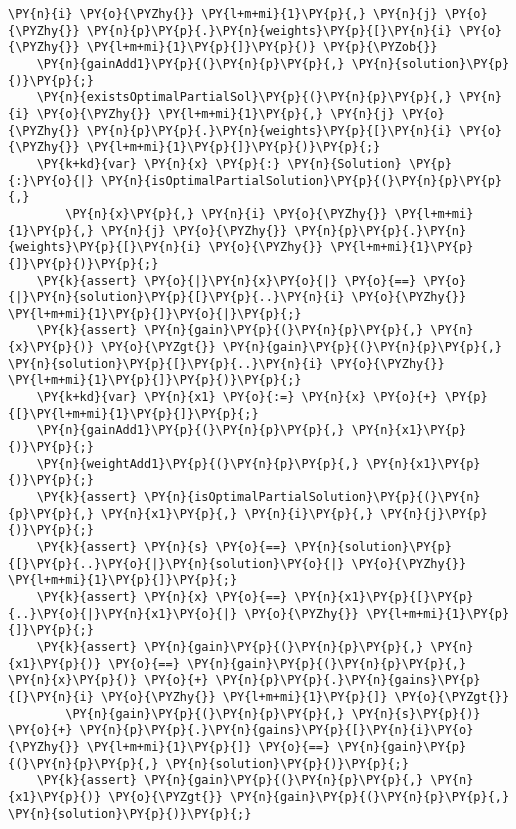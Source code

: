 \begin{sloppypar}
\begin{Verbatim}[commandchars=\\\{\}]
    \PY{n}{i} \PY{o}{\PYZhy{}} \PY{l+m+mi}{1}\PY{p}{,} \PY{n}{j} \PY{o}{\PYZhy{}} \PY{n}{p}\PY{p}{.}\PY{n}{weights}\PY{p}{[}\PY{n}{i} \PY{o}{\PYZhy{}} \PY{l+m+mi}{1}\PY{p}{]}\PY{p}{)} \PY{p}{\PYZob{}}
    \PY{n}{gainAdd1}\PY{p}{(}\PY{n}{p}\PY{p}{,} \PY{n}{solution}\PY{p}{)}\PY{p}{;}
    \PY{n}{existsOptimalPartialSol}\PY{p}{(}\PY{n}{p}\PY{p}{,} \PY{n}{i} \PY{o}{\PYZhy{}} \PY{l+m+mi}{1}\PY{p}{,} \PY{n}{j} \PY{o}{\PYZhy{}} \PY{n}{p}\PY{p}{.}\PY{n}{weights}\PY{p}{[}\PY{n}{i} \PY{o}{\PYZhy{}} \PY{l+m+mi}{1}\PY{p}{]}\PY{p}{)}\PY{p}{;}
    \PY{k+kd}{var} \PY{n}{x} \PY{p}{:} \PY{n}{Solution} \PY{p}{:}\PY{o}{|} \PY{n}{isOptimalPartialSolution}\PY{p}{(}\PY{n}{p}\PY{p}{,} 
        \PY{n}{x}\PY{p}{,} \PY{n}{i} \PY{o}{\PYZhy{}} \PY{l+m+mi}{1}\PY{p}{,} \PY{n}{j} \PY{o}{\PYZhy{}} \PY{n}{p}\PY{p}{.}\PY{n}{weights}\PY{p}{[}\PY{n}{i} \PY{o}{\PYZhy{}} \PY{l+m+mi}{1}\PY{p}{]}\PY{p}{)}\PY{p}{;}
    \PY{k}{assert} \PY{o}{|}\PY{n}{x}\PY{o}{|} \PY{o}{==} \PY{o}{|}\PY{n}{solution}\PY{p}{[}\PY{p}{..}\PY{n}{i} \PY{o}{\PYZhy{}} \PY{l+m+mi}{1}\PY{p}{]}\PY{o}{|}\PY{p}{;}
    \PY{k}{assert} \PY{n}{gain}\PY{p}{(}\PY{n}{p}\PY{p}{,} \PY{n}{x}\PY{p}{)} \PY{o}{\PYZgt{}} \PY{n}{gain}\PY{p}{(}\PY{n}{p}\PY{p}{,} \PY{n}{solution}\PY{p}{[}\PY{p}{..}\PY{n}{i} \PY{o}{\PYZhy{}} \PY{l+m+mi}{1}\PY{p}{]}\PY{p}{)}\PY{p}{;}
    \PY{k+kd}{var} \PY{n}{x1} \PY{o}{:=} \PY{n}{x} \PY{o}{+} \PY{p}{[}\PY{l+m+mi}{1}\PY{p}{]}\PY{p}{;}
    \PY{n}{gainAdd1}\PY{p}{(}\PY{n}{p}\PY{p}{,} \PY{n}{x1}\PY{p}{)}\PY{p}{;}
    \PY{n}{weightAdd1}\PY{p}{(}\PY{n}{p}\PY{p}{,} \PY{n}{x1}\PY{p}{)}\PY{p}{;}
    \PY{k}{assert} \PY{n}{isOptimalPartialSolution}\PY{p}{(}\PY{n}{p}\PY{p}{,} \PY{n}{x1}\PY{p}{,} \PY{n}{i}\PY{p}{,} \PY{n}{j}\PY{p}{)}\PY{p}{;}
    \PY{k}{assert} \PY{n}{s} \PY{o}{==} \PY{n}{solution}\PY{p}{[}\PY{p}{..}\PY{o}{|}\PY{n}{solution}\PY{o}{|} \PY{o}{\PYZhy{}} \PY{l+m+mi}{1}\PY{p}{]}\PY{p}{;}
    \PY{k}{assert} \PY{n}{x} \PY{o}{==} \PY{n}{x1}\PY{p}{[}\PY{p}{..}\PY{o}{|}\PY{n}{x1}\PY{o}{|} \PY{o}{\PYZhy{}} \PY{l+m+mi}{1}\PY{p}{]}\PY{p}{;}
    \PY{k}{assert} \PY{n}{gain}\PY{p}{(}\PY{n}{p}\PY{p}{,} \PY{n}{x1}\PY{p}{)} \PY{o}{==} \PY{n}{gain}\PY{p}{(}\PY{n}{p}\PY{p}{,} \PY{n}{x}\PY{p}{)} \PY{o}{+} \PY{n}{p}\PY{p}{.}\PY{n}{gains}\PY{p}{[}\PY{n}{i} \PY{o}{\PYZhy{}} \PY{l+m+mi}{1}\PY{p}{]} \PY{o}{\PYZgt{}} 
        \PY{n}{gain}\PY{p}{(}\PY{n}{p}\PY{p}{,} \PY{n}{s}\PY{p}{)} \PY{o}{+} \PY{n}{p}\PY{p}{.}\PY{n}{gains}\PY{p}{[}\PY{n}{i}\PY{o}{\PYZhy{}} \PY{l+m+mi}{1}\PY{p}{]} \PY{o}{==} \PY{n}{gain}\PY{p}{(}\PY{n}{p}\PY{p}{,} \PY{n}{solution}\PY{p}{)}\PY{p}{;}
    \PY{k}{assert} \PY{n}{gain}\PY{p}{(}\PY{n}{p}\PY{p}{,} \PY{n}{x1}\PY{p}{)} \PY{o}{\PYZgt{}} \PY{n}{gain}\PY{p}{(}\PY{n}{p}\PY{p}{,} \PY{n}{solution}\PY{p}{)}\PY{p}{;}

\end{Verbatim}
\end{sloppypar}
